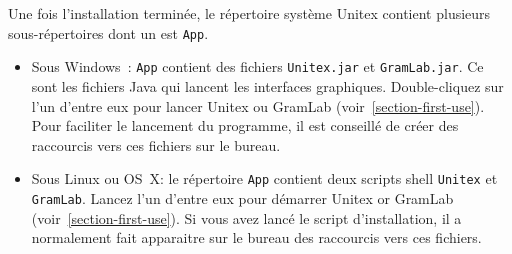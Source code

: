 \bigskip
\noindent Une fois l'installation terminée, le répertoire système Unitex contient plusieurs
sous-répertoires dont un est \verb+App+.
\begin{itemize}
\item Sous Windows~: \verb+App+ contient des fichiers \verb+Unitex.jar+
et \verb+GramLab.jar+. Ce sont les fichiers Java qui lancent les interfaces graphiques. Double-cliquez sur l'un
d'entre eux pour lancer Unitex ou GramLab (voir~\ref{section-first-use}). Pour faciliter le lancement du programme,
il est conseillé de créer des raccourcis vers ces fichiers sur le bureau.
\item Sous Linux ou OS~X: le répertoire \verb+App+ contient deux scripts shell \verb+Unitex+
et \verb+GramLab+. Lancez l'un d'entre eux pour démarrer Unitex or GramLab (voir~\ref{section-first-use}). Si vous
avez lancé le script d'installation, il a normalement fait apparaitre sur le bureau des raccourcis vers ces fichiers.
\end{itemize}









 




